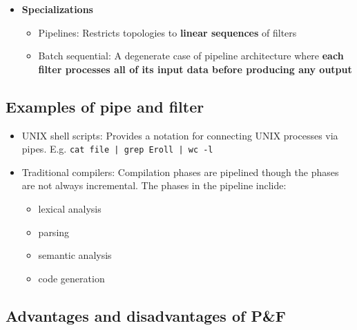 \documentclass[12pt]{book}
\begin{document}
\begin{itemize}
    \item \textbf{Specializations}
    \begin{itemize}
        \item Pipelines: Restricts topologies to \textbf{linear sequences} of filters
        \item Batch sequential: A degenerate case of pipeline architecture where \textbf{each filter processes all of its input data before producing any output}
    \end{itemize} 
\end{itemize}

\subsection{Examples of pipe and filter}

\begin{itemize}
    \item UNIX shell scripts: Provides a notation for connecting UNIX processes via pipes. E.g. \texttt{cat file | grep Eroll | wc -l}
    \item Traditional compilers: Compilation phases are pipelined though the phases are not always incremental. The phases in the pipeline inclide:
    \begin{itemize}
        \item lexical analysis
        \item parsing
        \item semantic analysis
        \item code generation
    \end{itemize} 
\end{itemize}

\subsection{Advantages and disadvantages of P\&F}
\end{document}
